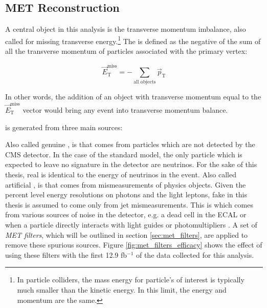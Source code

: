 
  \subsection{MET Reconstruction} \label{sec:MET_reco}
    A central object in this analysis is the transverse momentum imbalance, also called \MET for missing transverse energy.\footnote{In particle colliders, the mass energy for particle's of interest is typically much smaller than the kinetic energy. In this limit, the energy and momentum are the same.} The \MET is defined as the negative of the sum of all the transverse momentum of particles associated with the primary vertex:

    \[
      \vec{E}_{\text{T}}^{\text{miss}} = - \sum \limits_{\text{all objects}} \vec{p}_\text{T}
    \]

    In other words, the addition of an object with transverse momentum equal to the $\vec{E}_{\text{T}}^{\text{miss}}$ vector would bring any event into transverse momentum balance.

    \MET is generated from three main sources:
    \begin{enumerate}
       Also called genuine \MET, is \MET that comes from particles which are not detected by the CMS detector. In the case of the standard model, the only particle which is expected to leave no signature in the detector are neutrinos. For the sake of this thesis, real \MET is identical to the energy of neutrinos in the event.
       Also called artificial \MET, is \MET that comes from mismeasurements of physics objects. Given the percent level energy resolutions on photons and the light leptons, fake \MET in this thesis is assumed to come only from jet mismeasurements.
       This is \MET which comes from various sources of noise in the detector, e.g. a dead cell in the ECAL or when a particle directly interacts with light guides or photomultipliers \cite[sec 5]{cms_met}. A set of \emph{MET filters}, which will be outlined in section \ref{sec:met_filters}, are applied to remove these spurious sources. Figure \ref{fig:met_filters_efficacy} shows the effect of using these filters with the first 12.9 fb$^{-1}$ of the data collected for this analysis.
    \end{enumerate}

